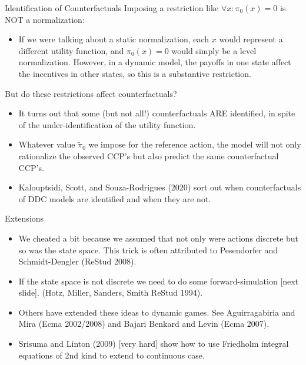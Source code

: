 \documentclass[aspectratio=169,11pt]{beamer}
\begin{document}
\begin{frame}{Identification of Counterfactuals}
Imposing a restriction like $\forall x:\pi_{0}\left(x\right)=0$
is NOT a normalization: 
\begin{itemize}
\item If we were talking
about a static normalization, each $x$ would represent a different
utility function, and $\pi_{0}\left(x\right)=0$ would simply be a
level normalization. However, in a dynamic model, the payoffs in one
state affect the incentives in other states, so this is a \alert{substantive
restriction.}
\end{itemize}
But do these restrictions affect counterfactuals?
\begin{itemize}
\item It turns out that some (but not all!) counterfactuals ARE identified, in spite of the
under-identification of the utility function. 
\item Whatever value
$\widetilde{\pi}_{0}$ we impose for the reference action, the model will not only
rationalize the observed CCP's but also predict \alert{the same counterfactual CCP's}.
\item Kalouptsidi, Scott, and Souza-Rodrigues (2020) sort out when counterfactuals
of DDC models are identified and when they are not.
\end{itemize}
\end{frame}

\begin{frame}{Extensions}
\begin{itemize}
\item We cheated a bit because we assumed that not only were actions discrete but so was the state space. This trick is often attributed to Pesendorfer and Schmidt-Dengler (ReStud 2008).
\item If the state space is not discrete we need to do some forward-simulation [next slide]. (Hotz, Miller, Sanders, Smith ReStud 1994).
\item Others have extended these ideas to \alert{dynamic games}. See Aguirragabiria and Mira (Ecma 2002/2008) and Bajari Benkard and Levin (Ecma 2007).
\item Srisuma and Linton (2009) [very hard] show how to use Friedholm integral equations of 2nd kind to extend to continuous case.
\end{itemize}
\end{frame}
\end{document}
